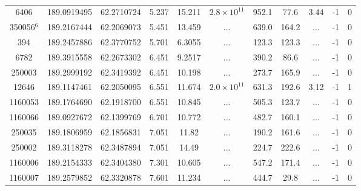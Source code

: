 \begin{table}
\begin{tabular}{ccccccccccc}
       6406 &                  189.0919495 &                 62.2710724 &          5.237 &           15.211 & $2.8\times10^{11}$ &          952.1 &        77.6 &        3.44 &               -1 &                  0 \\
 350056$^6$ &                  189.2167444 &                 62.2069073 &          5.451 &           13.459 &                ... &          639.0 &       164.2 &         ... &               -1 &                  0 \\
        394 &                  189.2457886 &                 62.3770752 &          5.701 &           6.3055 &                ... &          123.3 &       123.3 &         ... &               -1 &                  0 \\
       6782 &                  189.3915558 &                 62.2673302 &          6.451 &           9.2517 &                ... &          390.2 &        86.6 &         ... &               -1 &                  0 \\
     250003 &                  189.2999192 &                 62.3419392 &          6.451 &           10.198 &                ... &          273.7 &       165.9 &         ... &               -1 &                  0 \\
      12646 &                  189.1147461 &                 62.2050095 &          6.551 &           11.674 & $2.0\times10^{11}$ &          631.3 &       192.6 &        3.12 &               -1 &                  1 \\
    1160053 &                  189.1764690 &                 62.1918700 &          6.551 &           10.845 &                ... &          505.3 &       123.7 &         ... &               -1 &                  0 \\
    1160066 &                  189.0927672 &                 62.1399769 &          6.701 &           10.772 &                ... &          482.7 &       160.1 &         ... &               -1 &                  0 \\
     250035 &                  189.1806959 &                 62.1856831 &          7.051 &            11.82 &                ... &          190.2 &       161.6 &         ... &               -1 &                  0 \\
     250002 &                  189.3118278 &                 62.3487894 &          7.051 &            14.49 &                ... &          224.7 &       222.6 &         ... &               -1 &                  0 \\
    1160006 &                  189.2154333 &                 62.3404380 &          7.301 &           10.605 &                ... &          547.2 &       171.4 &         ... &               -1 &                  0 \\
    1160007 &                  189.2579852 &                 62.3320878 &          7.601 &           11.234 &                ... &          444.7 &        29.8 &         ... &               -1 &                  0 \\
  \hline
  \end{tabular}
  \caption{
  \label{Tab00}}
\end{table}
